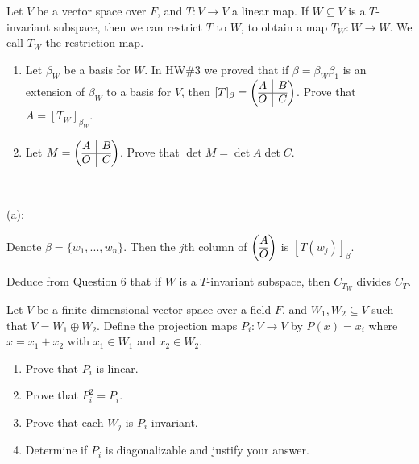 \documentclass{eh-homework}
\begin{document}
    \begin{question}{6}
    Let $V$ be a vector space over $F$, and $T : V \to V$ a linear map. If $W \subseteq V$ is a $T$-invariant subspace, then we can restrict \(T\) to \(W\), to obtain a map \(T_W : W \to W\). We call \(T_W\) the restriction map.
    
    \begin{enumerate}[label=(\alph*)]
        \item Let \(\beta _W\) be a basis for \(W\). In HW\#3 we proved that if \(\beta = \beta _W \beta _1\) is an extension of \(\beta_W\) to a basis for \(V\), then \([T]_\beta = \left( \begin{array}{@{}c|c@{}}
            A & B \\
            \hline
            O & C \\
        \end{array}\right)\). Prove that \(A = [T_W]_{\beta_W}\).

        \item Let \(M = \left(\begin{array}{@{}c|c@{}}
            A & B \\
            \hline
            O & C \\
        \end{array}\right)\). Prove that \(\det M = \det A \det C\).
    \end{enumerate}
    \tcblower
    \ 

    (a):

    Denote \(\beta = \{ w_1, ..., w_n \}\). Then the \(j\)th column of \(\left( \begin{array}{@{}c@{}}
        A \\
        \hline
        O \\
    \end{array} \right)\) is \([T(w_j)]_\beta\).
    \end{question}
    
    \begin{question}{7}
    Deduce from Question 6 that if $W$ is a $T$-invariant subspace, then $C_{T_W}$ divides $C_T$.
    \end{question}
    
    \begin{question}{8}
    Let $V$ be a finite-dimensional vector space over a field $F$, and $W_1, W_2 \subseteq V$ such that $V = W_1 \oplus W_2$. Define the projection maps $P_i : V \to V$ by $P(x) = x_i$ where $x = x_1 + x_2$ with $x_1 \in W_1$ and $x_2 \in W_2$.
    
    \begin{enumerate}
        \item Prove that $P_i$ is linear.
        \item Prove that $P_i^2 = P_i$.
        \item Prove that each $W_j$ is $P_i$-invariant.
        \item Determine if $P_i$ is diagonalizable and justify your answer.
    \end{enumerate}
    \end{question}
    
\end{document}
